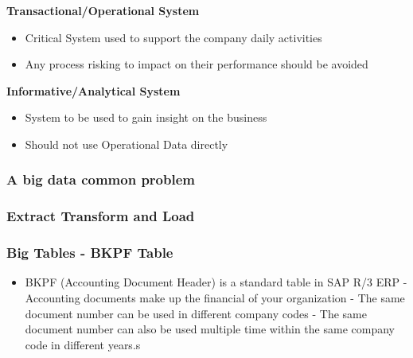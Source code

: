 \textbf{Transactional/Operational System}
\begin{itemize}
	\item Critical System used  to support the company daily activities
	\item Any process risking to impact on their performance should be avoided
\end{itemize}

\textbf{Informative/Analytical System}
\begin{itemize}
	\item System to be used to gain insight on the business
	\item Should not use Operational Data directly
\end{itemize}

\subsubsection{A big data common problem}
\begin{center}
\end{center}

\subsubsection{Extract Transform and Load}

\begin{center}
\end{center}

\subsubsection{Big Tables - BKPF Table}
\begin{center}
\end{center}

\begin{itemize}
	\item BKPF (Accounting Document Header) is a standard table in SAP R/3 ERP
	- Accounting documents make up the financial of your organization
	- The same document number can be used in different company codes
	- The same document number can also be used multiple time within the same company code in different years.s
\end{itemize}

\begin{center}
\end{center}

